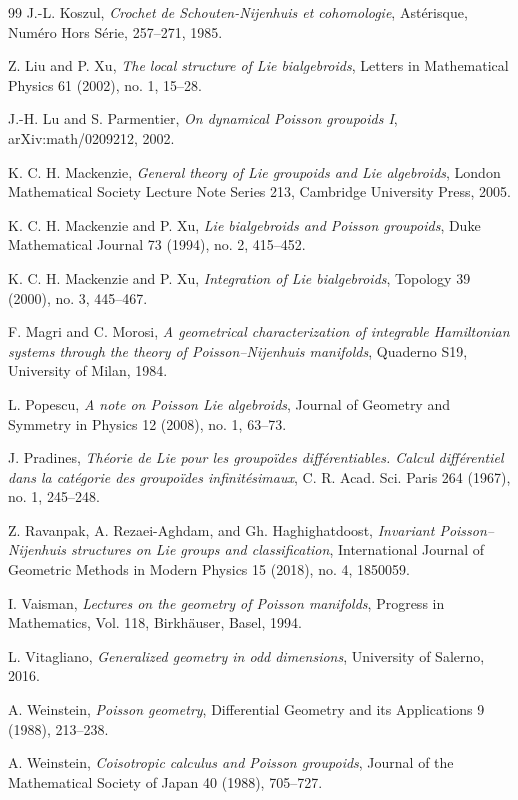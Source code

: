 \documentclass{article}
\begin{document}
\begin{thebibliography}{99}
J.-L. Koszul,
\textit{Crochet de Schouten-Nijenhuis et cohomologie},
Ast\'erisque, Num\'ero Hors S\'erie, 257--271, 1985.

Z. Liu and P. Xu,
\textit{The local structure of Lie bialgebroids},
Letters in Mathematical Physics 61 (2002), no. 1, 15--28.

J.-H. Lu and S. Parmentier,
\textit{On dynamical Poisson groupoids I},
arXiv:math/0209212, 2002.

K. C. H. Mackenzie,
\textit{General theory of Lie groupoids and Lie algebroids},
London Mathematical Society Lecture Note Series 213, Cambridge University Press, 2005.

K. C. H. Mackenzie and P. Xu,
\textit{Lie bialgebroids and Poisson groupoids},
Duke Mathematical Journal 73 (1994), no. 2, 415--452.

K. C. H. Mackenzie and P. Xu,
\textit{Integration of Lie bialgebroids},
Topology 39 (2000), no. 3, 445--467.

F. Magri and C. Morosi,
\textit{A geometrical characterization of integrable Hamiltonian systems through the theory of Poisson–Nijenhuis manifolds},
Quaderno S19, University of Milan, 1984.

L. Popescu,
\textit{A note on Poisson Lie algebroids},
Journal of Geometry and Symmetry in Physics 12 (2008), no. 1, 63--73.

J. Pradines,
\textit{Th\'eorie de Lie pour les groupo\"ides diff\'erentiables. Calcul diff\'erentiel dans la cat\'egorie des groupo\"ides infinit\'esimaux},
C. R. Acad. Sci. Paris 264 (1967), no. 1, 245--248.

Z. Ravanpak, A. Rezaei-Aghdam, and Gh. Haghighatdoost,
\textit{Invariant Poisson–Nijenhuis structures on Lie groups and classification},
International Journal of Geometric Methods in Modern Physics 15 (2018), no. 4, 1850059.

I. Vaisman,
\textit{Lectures on the geometry of Poisson manifolds},
Progress in Mathematics, Vol. 118, Birkh\"auser, Basel, 1994.

L. Vitagliano,
\textit{Generalized geometry in odd dimensions},
University of Salerno, 2016.

A. Weinstein,
\textit{Poisson geometry},
Differential Geometry and its Applications 9 (1988), 213--238.

A. Weinstein,
\textit{Coisotropic calculus and Poisson groupoids},
Journal of the Mathematical Society of Japan 40 (1988), 705--727.

\end{thebibliography}
\end{document}

